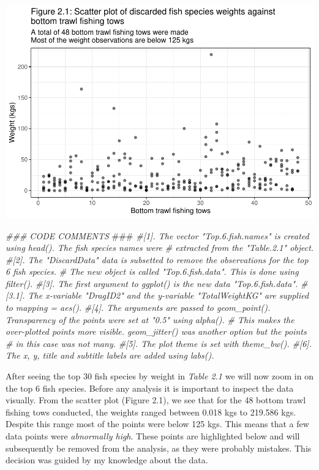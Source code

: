\documentclass[
]{book}
\newenvironment{Shaded}{\begin{snugshade}}{\end{snugshade}}
\newcommand{\AlertTok}[1]{\textcolor[rgb]{0.94,0.16,0.16}{#1}}
\newcommand{\CommentTok}[1]{\textcolor[rgb]{0.56,0.35,0.01}{\textit{#1}}}
\begin{document}
\begin{center}\includegraphics{bookdown-demo_files/figure-latex/unnamed-chunk-11-1} \end{center}

\begin{Shaded}
\begin{Highlighting}[]
\CommentTok{### CODE COMMENTS }\AlertTok{###}
\CommentTok{#[1]. The vector "Top.6.fish.names" is created using head(). The fish species names were }
\CommentTok{#     extracted from the "Table.2.1" object. }
\CommentTok{#[2]. The "DiscardData" data is subsetted to remove the observations for the top 6 fish species. }
\CommentTok{#     The new object is called "Top.6.fish.data". This is done using filter().}
\CommentTok{#[3]. The first argument to ggplot() is the new data "Top.6.fish.data". }
\CommentTok{#[3.1]. The x-variable "DragID2" and the y-variable "TotalWeightKG" are supplied to mapping = aes().   }
\CommentTok{#[4]. The arguments are passed to geom_point(). Transparency of the points were set at "0.5" using alpha().}
\CommentTok{#     This makes the over-plotted points more visible. geom_jitter() was another option but the points }
\CommentTok{#     in this case was not many.     }
\CommentTok{#[5]. The plot theme is set with theme_bw(). }
\CommentTok{#[6]. The x, y, title and subtitle labels are added using labs().}
\end{Highlighting}
\end{Shaded}

After seeing the top 30 fish species by weight in \emph{Table 2.1} we will now zoom in on the top 6 fish species. Before any analysis it is important to inspect the data visually. From the scatter plot (Figure 2.1), we see that for the 48 bottom trawl fishing tows conducted, the weights ranged between 0.018 kgs to 219.586 kgs. Despite this range most of the points were below 125 kgs. This means that a few data points were \emph{abnormally high}. These points are highlighted below and will subsequently be removed from the analysis, as they were probably mistakes. This decision was guided by my knowledge about the data.
\end{document}
